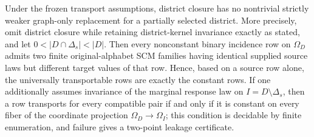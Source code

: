 Under the frozen transport assumptions, district closure has no nontrivial strictly weaker graph-only replacement for a partially selected district.  More precisely, omit district closure while retaining district-kernel invariance exactly as stated, and let \(0<|D\cap\Delta_s|<|D|\).  Then every nonconstant binary incidence row on \(\Omega_D\) admits two finite original-alphabet SCM families having identical supplied source laws but different target values of that row.  Hence, based on a source row alone, the universally transportable rows are exactly the constant rows.  If one additionally assumes invariance of the marginal response law on \(I=D\setminus\Delta_s\), then a row transports for every compatible pair if and only if it is constant on every fiber of the coordinate projection \(\Omega_D\to\Omega_I\); this condition is decidable by finite enumeration, and failure gives a two-point leakage certificate.